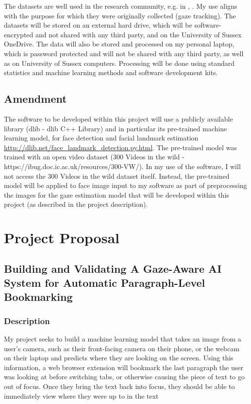 \documentclass{report}
\begin{document}
The datasets are well used in the research community, e.g. in \cite{Valliappan2020accelerating}, \cite{seonwook2019fewshot}. My use aligns with the purpose for which they were originally collected (gaze tracking). The datasets will be stored on an external hard drive, which will be software-encrypted and not shared with any third party, and on the University of Sussex OneDrive. The data will also be stored and processed on my personal laptop, which is password protected and will not be shared with any third party, as well as on University of Sussex computers. Processing will be done using standard statistics and machine learning methods and software development kits.

\section*{Amendment}

The software to be developed within this project will use a publicly available library (dlib - dlib C++ Library) and in particular its pre-trained machine learning model, for face detection and facial landmark estimation \url{http://dlib.net/face_landmark_detection.py.html}. The pre-trained model was trained with an open video dataset (300 Videos in the wild - {https://ibug.doc.ic.ac.uk/resources/300-VW/}). In my use of the software, I will not access the 300 Videos in the wild dataset itself. Instead, the pre-trained model will be applied to face image input to my software as part of preprocessing the images for the gaze estimation model that will be developed within this project (as described in the project description).


\chapter{Project Proposal}

\section*{Building and Validating A Gaze-Aware AI System for Automatic Paragraph-Level Bookmarking}

\subsection*{Description}
My project seeks to build a machine learning model that takes an image from a user's camera, such as their front-facing camera on their phone, or the webcam on their laptop and predicts where they are looking on the screen. Using this information, a web browser extension will bookmark the last paragraph the user was looking at before switching tabs, or otherwise causing the piece of text to go out of focus. Once they bring the text back into focus, they should be able to immediately view where they were up to in the text
\end{document}
